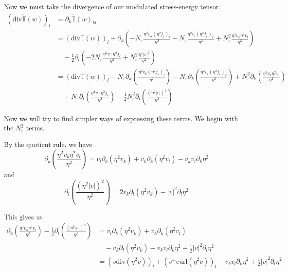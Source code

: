 \documentclass[a4paper]{article}
\newcommand{\curl}{\mathrm{curl}}
\renewcommand{\div}{\mathrm{div}}
\begin{document}
Now we must take the divergence of our modulated stress-energy tensor.
\begin{align}
  ( \div \tilde{\mathbb{T}}(w) )_l &= \partial_k \tilde{\mathbb{T}}(w)_{kl} \nonumber \\
  &= ( \div \mathbb{T}(w) )_l + \partial_k \left( - N_\varepsilon \frac{\eta^2 v_k (\eta^2 j_\varepsilon)_l}{\eta^2} - N_\varepsilon \frac{\eta^2 v_l
  (\eta^2 j_\varepsilon)_k}{\eta^2} +  N_\varepsilon^2 \frac{\eta^2 v_k \eta^2 v_l}{\eta^2} \right) \nonumber \\
  &\quad - \frac{1}{2} \partial_l \left( -2 N_\varepsilon \frac{\eta^2 v \cdot \eta^2 j_\varepsilon}{\eta^2} + N_\varepsilon^2 \frac{\eta^4
  |v|^2}{\eta^2} \right) \nonumber \\
  &= (\div \mathbb{T}(w))_l - N_\varepsilon \partial_k \left( \frac{\eta^2 v_k (\eta^2 j_\varepsilon)_l}{\eta^2} \right) - N_\varepsilon
  \partial_k \left( \frac{\eta^2 v_l (\eta^2 j_\varepsilon)_k}{\eta^2} \right) + N_\varepsilon^2 \partial_k \left( \frac{\eta^2 v_k \eta^2
  v_l}{\eta^2} \right) \nonumber \\
  &\quad + N_\varepsilon \partial_l \left( \frac{\eta^2 v \cdot \eta^2 j_\varepsilon}{\eta^2} \right) - \frac{1}{2} N_\varepsilon^2 \partial_l \left(
  \frac{(\eta^2 |v|)^2}{\eta^2} \right)
  \label{eqn:div_mod_stress_energy1}
\end{align}

Now we will try to find simpler ways of expressing these terms. We begin with the $N_\varepsilon^2$ terms.

By the quotient rule, we have
\begin{equation}
  \partial_k \left( \frac{\eta^2 v_k \eta^2 v_l}{\eta^2} \right) = v_l \partial_k (\eta^2 v_k) + v_k \partial_k(\eta^2 v_l) - v_k v_l \partial_k
  \eta^2
  \label{eqn:quot_rule1}
\end{equation}
and
\begin{equation}
  \partial_l \left( \frac{(\eta^2 |v|)^2}{\eta^2} \right) = 2 v_k \partial_l (\eta^2 v_k) - |v|^2 \partial_l \eta^2
  \label{eqn:quot_rule2}
\end{equation}

This gives us
\begin{align}
  \partial_k \left( \frac{\eta^2 v_k \eta^2 v_l}{\eta^2} \right) - \frac{1}{2} \partial_l \left( \frac{(\eta^2 |v|)^2}{\eta^2} \right) &= v_l \partial_k (\eta^2
  v_k) + v_k \partial_k( \eta^2 v_l ) \nonumber \\
  &\quad - v_k \partial_l (\eta^2 v_k) - v_k v_l \partial_k \eta^2 + \frac{1}{2} |v|^2 \partial_l \eta^2 \nonumber \\
  &= (v \div( \eta^2 v ) )_l + (v^\perp \curl( \eta^2 v) )_l - v_k v_l \partial_k \eta^2 + \frac{1}{2} |v|^2 \partial_l \eta^2
  \label{eqn:quot_rules}
\end{align}
\end{document}
